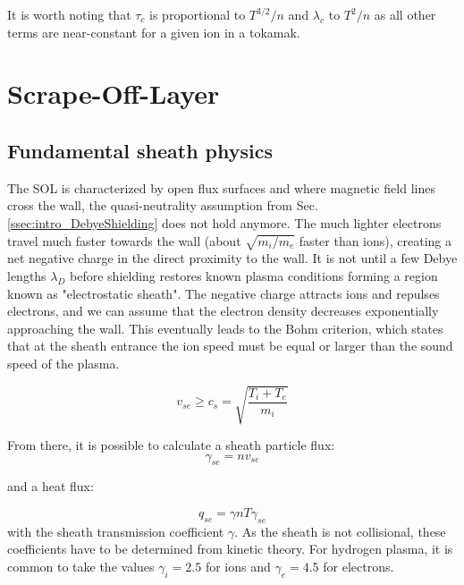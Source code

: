 It is worth noting that $\tau_c$ is proportional to $T^{3/2}/n$ and $\lambda_c$ to $T^2/n$ as all other terms are near-constant for a given ion in a tokamak.



\section{Scrape-Off-Layer}
\label{sec:intro_SOL}



\subsection{Fundamental sheath physics}
\label{sec:intro_sheath}

The SOL is characterized by open flux surfaces and where magnetic field lines cross the wall, the quasi-neutrality assumption from Sec. \ref{ssec:intro_DebyeShielding} does not hold anymore. The much lighter electrons travel much faster towards the wall (about $\sqrt{m_i/m_e}$ faster than ions), creating a net negative charge in the direct proximity to the wall. It is not until a few Debye lengths $\lambda_D$ before shielding restores known plasma conditions forming a region known as "electrostatic sheath". The negative charge attracts ions and repulses electrons, and we can assume that the electron density decreases exponentially approaching the wall. This eventually leads to the Bohm criterion\cite{riemann1991bohm}, which states that at the sheath entrance the ion speed must be equal or larger than the sound speed of the plasma.

\begin{equation}
	\label{eq:intro_BohmCriterion}
	v_{se} \ge c_s = \sqrt{\frac{T_i+T_e}{m_i}}
\end{equation}

From there, it is possible to calculate a sheath particle flux:
\begin{equation}
	\gamma_{se} = nv_{se}
\end{equation}

and a heat flux:

\begin{equation}
	q_{se} = \gamma n T \gamma_{se}
\end{equation}
with the sheath transmission coefficient $\gamma$. As the sheath is not collisional, these coefficients have to be determined from kinetic theory\cite{Stangeby_2000}. For hydrogen plasma, it is common to take the values $\gamma_i = 2.5$ for ions and $\gamma_e = 4.5$ for electrons.




